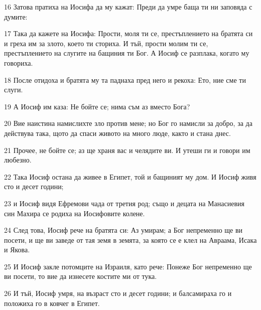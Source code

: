 \par 16 Затова пратиха на Иосифа да му кажат: Преди да умре баща ти ни заповяда с думите:
\par 17 Така да кажете на Иосифа: Прости, моля ти се, престъплението на братята си и греха им за злото, което ти сториха. И тъй, прости молим ти се, престъплението на слугите на бащиния ти Бог. А Иосиф се разплака, когато му говориха.
\par 18 После отидоха и братята му та паднаха пред него и рекоха: Ето, ние сме ти слуги.
\par 19 А Иосиф им каза: Не бойте се; нима съм аз вместо Бога?
\par 20 Вие наистина намислихте зло против мене; но Бог го намисли за добро, за да действува така, щото да спаси живото на много люде, както и стана днес.
\par 21 Прочее, не бойте се; аз ще храня вас и челядите ви. И утеши ги и говори им любезно.
\par 22 Така Иосиф остана да живее в Египет, той и бащиният му дом. И Иосиф живя сто и десет години;
\par 23 и Иосиф видя Ефремови чада от третия род; също и децата на Манасиевия син Махира се родиха на Иосифовите колене.
\par 24 След това, Иосиф рече на братята си: Аз умирам; а Бог непременно ще ви посети, и ще ви заведе от тая земя в земята, за която се е клел на Авраама, Исака и Якова.
\par 25 И Иосиф закле потомците на Израиля, като рече: Понеже Бог непременно ще ви посети, то вие да изнесете костите ми от тука.
\par 26 И тъй, Иосиф умря, на възраст сто и десет години; и балсамираха го и положиха го в ковчег в Египет.

